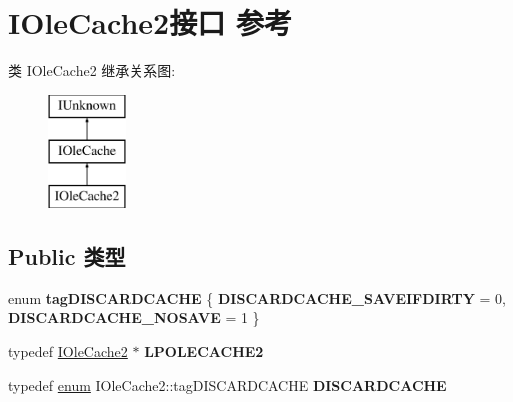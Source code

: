 \hypertarget{interface_i_ole_cache2}{}\section{I\+Ole\+Cache2接口 参考}
\label{interface_i_ole_cache2}
类 I\+Ole\+Cache2 继承关系图\+:\begin{figure}[H]
\begin{center}
\leavevmode
\includegraphics[height=3.000000cm]{interface_i_ole_cache2}
\end{center}
\end{figure}
\subsection*{Public 类型}
\begin{DoxyCompactItemize}
\item 
\mbox{\label{interface_i_ole_cache2_a53e9209e58b8128bed2e7c3996259b13}} 
enum {\bfseries tag\+D\+I\+S\+C\+A\+R\+D\+C\+A\+C\+HE} \{ {\bfseries D\+I\+S\+C\+A\+R\+D\+C\+A\+C\+H\+E\+\_\+\+S\+A\+V\+E\+I\+F\+D\+I\+R\+TY} = 0, 
{\bfseries D\+I\+S\+C\+A\+R\+D\+C\+A\+C\+H\+E\+\_\+\+N\+O\+S\+A\+VE} = 1
 \}
\item 
\mbox{\label{interface_i_ole_cache2_afcc29f185063a82cbc1b934fed6d3f08}} 
typedef \hyperlink{interface_i_ole_cache2}{I\+Ole\+Cache2} $\ast$ {\bfseries L\+P\+O\+L\+E\+C\+A\+C\+H\+E2}
\item 
\mbox{\label{interface_i_ole_cache2_a0a830d5c1d880db4143a4be9da1db4db}} 
typedef \hyperlink{interfaceenum}{enum} I\+Ole\+Cache2\+::tag\+D\+I\+S\+C\+A\+R\+D\+C\+A\+C\+HE {\bfseries D\+I\+S\+C\+A\+R\+D\+C\+A\+C\+HE}
\end{DoxyCompactItemize}
